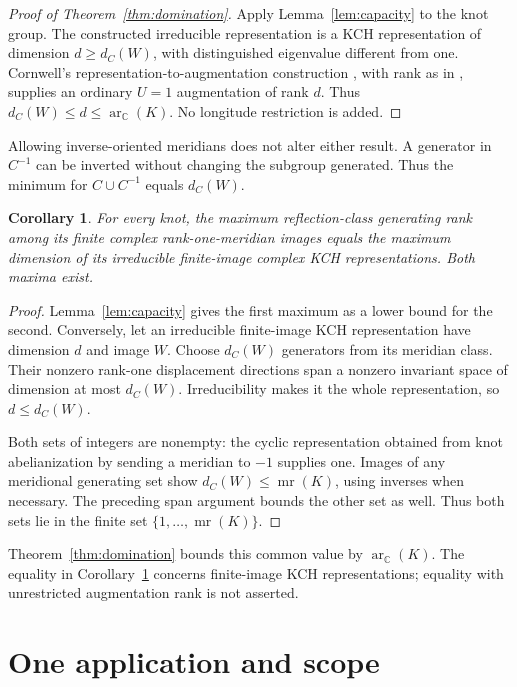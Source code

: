 \documentclass[11pt]{article}
\newtheorem{corollary}[theorem]{Corollary}
\newcommand{\C}{\mathbb C}
\newcommand{\ar}{\operatorname{ar}_{\C}}
\begin{document}
\begin{proof}[Proof of Theorem~\ref{thm:domination}]
Apply Lemma~\ref{lem:capacity} to the knot group.
The constructed irreducible representation is a KCH representation
of dimension $d\ge d_C(W)$, with distinguished eigenvalue different
from one. Cornwell's representation-to-augmentation construction
\cite[Proposition~2.12, printed p.~9]{cor17}, with rank as in
\cite[Definition~1.8, printed p.~3]{cor17}, supplies an ordinary
$U=1$ augmentation of rank $d$.
Thus $d_C(W)\le d\le\ar(K)$. No longitude restriction is added.
\end{proof}

Allowing inverse-oriented meridians does not alter either result.
A generator in $C^{-1}$ can be inverted without changing the subgroup
generated. Thus the minimum for $C\cup C^{-1}$ equals $d_C(W)$.

\begin{corollary}\label{cor:finitecapacity}
For every knot, the maximum reflection-class generating rank
among its finite complex rank-one-meridian images equals the
maximum dimension of its irreducible finite-image complex KCH
representations. Both maxima exist.
\end{corollary}
\begin{proof}
Lemma~\ref{lem:capacity} gives the first maximum as a lower bound
for the second. Conversely, let an irreducible finite-image KCH
representation have dimension $d$ and image $W$.
Choose $d_C(W)$ generators from its meridian class.
Their nonzero rank-one displacement directions span a nonzero
invariant space of dimension at most $d_C(W)$.
Irreducibility makes it the whole representation, so
$d\le d_C(W)$.

Both sets of integers are nonempty: the cyclic representation obtained
from knot abelianization by sending a meridian to $-1$ supplies one.
Images of any meridional generating set show
$d_C(W)\le\operatorname{mr}(K)$, using inverses when necessary.
The preceding span argument bounds the other set as well.
Thus both sets lie in the finite set
$\{1,\ldots,\operatorname{mr}(K)\}$.
\end{proof}

Theorem~\ref{thm:domination} bounds this common value by $\ar(K)$.
The equality in Corollary~\ref{cor:finitecapacity} concerns
finite-image KCH representations; equality with unrestricted
augmentation rank is not asserted.

\section{One application and scope}
\end{document}
